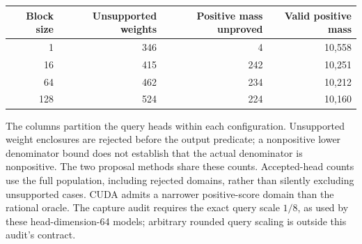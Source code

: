 \begin{center}
\begin{tabular}{rrrr}
\toprule
Block size & Unsupported weights & Positive mass unproved & Valid positive mass \\
\midrule
1 & 346 & 4 & 10,558 \\
16 & 415 & 242 & 10,251 \\
64 & 462 & 234 & 10,212 \\
128 & 524 & 224 & 10,160 \\
\bottomrule
\end{tabular}
\end{center}
The columns partition the query heads within each configuration. Unsupported weight enclosures are rejected before the output predicate; a nonpositive lower denominator bound does not establish that the actual denominator is nonpositive. The two proposal methods share these counts. Accepted-head counts use the full population, including rejected domains, rather than silently excluding unsupported cases. CUDA admits a narrower positive-score domain than the rational oracle. The capture audit requires the exact query scale $1/8$, as used by these head-dimension-64 models; arbitrary rounded query scaling is outside this audit's contract.
